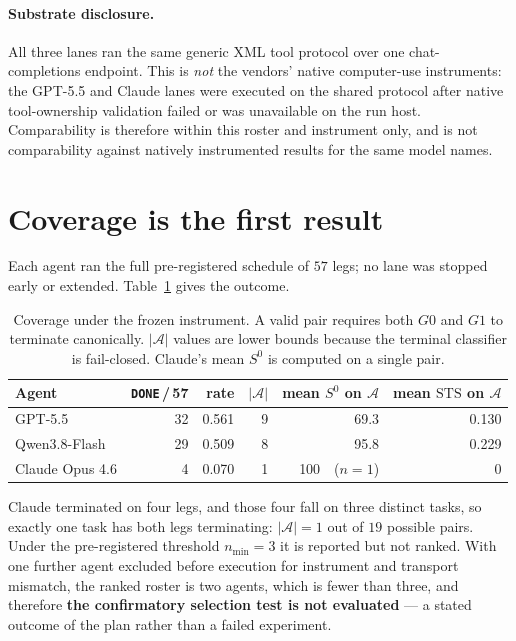 \documentclass{article}
\newcommand{\A}{\mathcal{A}}
\newcommand{\STS}{\mathrm{STS}}
\begin{document}
\paragraph{Substrate disclosure.}
All three lanes ran the same generic XML tool protocol over one chat-completions endpoint.
This is \emph{not} the vendors' native computer-use instruments: the GPT-5.5 and Claude lanes were executed on the shared protocol after native tool-ownership validation failed or was unavailable on the run host.
Comparability is therefore within this roster and instrument only, and is not comparability against natively instrumented results for the same model names.

\section{Coverage is the first result}
\label{sec:coverage}

Each agent ran the full pre-registered schedule of $57$ legs; no lane was stopped early or extended.
Table~\ref{tab:coverage} gives the outcome.

\begin{table}[t]
\centering
\small
\caption{Coverage under the frozen instrument. A valid pair requires both $G0$ and $G1$ to terminate canonically. $|\A|$ values are lower bounds because the terminal classifier is fail-closed. Claude's mean $S^{0}$ is computed on a single pair.}
\label{tab:coverage}
\begin{tabular}{lrrrrr}
\toprule
Agent & \texttt{DONE}\,/\,57 & rate & $|\A|$ & mean $S^{0}$ on $\A$ & mean $\STS$ on $\A$ \\
\midrule
GPT-5.5          & 32 & 0.561 & 9 & 69.3 & 0.130 \\
Qwen3.8-Flash    & 29 & 0.509 & 8 & 95.8 & 0.229 \\
Claude Opus 4.6  &  4 & 0.070 & 1 & 100\ \ ($n{=}1$) & 0 \\
\bottomrule
\end{tabular}
\end{table}

Claude terminated on four legs, and those four fall on three distinct tasks, so exactly one task has both legs terminating: $|\A|=1$ out of $19$ possible pairs.
Under the pre-registered threshold $n_{\min}=3$ it is reported but not ranked.
With one further agent excluded before execution for instrument and transport mismatch, the ranked roster is two agents, which is fewer than three, and therefore \textbf{the confirmatory selection test is not evaluated} --- a stated outcome of the plan rather than a failed experiment.
\end{document}
